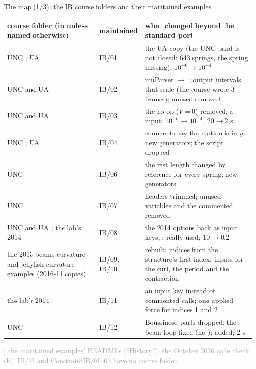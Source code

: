 \documentclass[aspectratio=169,11pt]{beamer}
\newcommand{\sourcecredit}[1]{\vfill\begin{flushright}\tiny\textcolor{DarkGray}{#1}\end{flushright}}
\begin{document}
\begin{frame}{The map (1/3): the IB course folders and their maintained examples}
\label{fr:map1}
\tiny
\renewcommand{\arraystretch}{1.05}
\setlength{\tabcolsep}{4pt}
\begin{tabular}{@{}L{0.35\textwidth}L{0.12\textwidth}L{0.47\textwidth}@{}}
\toprule
course folder (in  unless named otherwise) & maintained & what changed beyond the standard port \\
\midrule
UNC ; UA  & IB/01 & the UA copy (the UNC band is not closed: 643 springs, the spring  missing);  $10^{-6} \to 10^{-4}$ \\
UNC and UA  & IB/02 & muParser  $\to$ ; output intervals that scale (the course wrote 3 frames); unused  removed \\
UNC and UA  & IB/03 & the no-op  ($V = 0$) removed; a  input;  $10^{-5} \to 10^{-4}$,  $20 \to 2$ s \\
UNC ; UA  & IB/04 & comments say the motion is in $y$; new generators; the  script dropped \\
UNC  & IB/06 & the rest length changed by reference for every spring; new generators \\
UNC  & IB/07 & headers trimmed; unused variables and the commented  removed \\
UNC and UA ; the lab's 2014  & IB/08 & the 2014 options back as input keys; ;  really used;  $10 \to 0.2$ \\
the 2013 beams-curvature and jellyfish-curvature examples (2016-11 copies) & IB/09, IB/10 & rebuilt: indices from the structure's first index; inputs for the curl, the period and the contraction \\
the lab's 2014  & IB/11 & an  input key instead of commented calls; one applied force for indices 1 and 2 \\
UNC  & IB/12 & Boussinesq parts dropped; the beam loop fixed (no );  added; 2 s \\
\bottomrule
\end{tabular}
\sourcecredit{; the maintained examples' READMEs (``History''); the October 2026 code check (b). IB/13 and ConstraintIB/01--03 have no course folder.}
\end{frame}
\end{document}
